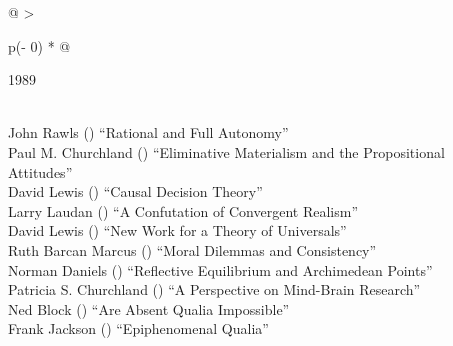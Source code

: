 \documentclass[
  10pt,
  letterpaper,
  DIV=11,
  numbers=noendperiod,
  twoside]{scrartcl}
\begin{document}
\begin{longtable}[]{@{}
  >{\raggedright\arraybackslash}p{(\columnwidth - 0\tabcolsep) * }@{}}

\caption{\label{tbl-top-ten-1980}Most cited articles published less than
ten years ago as of 1989.}

\tabularnewline

\toprule\noalign{}
\begin{minipage}[b]{\linewidth}\raggedright
1989
\end{minipage} \\
\midrule\noalign{}
\endhead
\bottomrule\noalign{}
\endlastfoot
John Rawls
()
``Rational and Full Autonomy'' \\
Paul M. Churchland
()
``Eliminative Materialism and the Propositional Attitudes'' \\
David Lewis
()
``Causal Decision Theory'' \\
Larry Laudan
()
``A Confutation of Convergent Realism'' \\
David Lewis
()
``New Work for a Theory of Universals'' \\
Ruth Barcan Marcus
()
``Moral Dilemmas and Consistency'' \\
Norman Daniels
()
``Reflective Equilibrium and Archimedean Points'' \\
Patricia S. Churchland
()
``A Perspective on Mind-Brain Research'' \\
Ned Block
()
``Are Absent Qualia Impossible'' \\
Frank Jackson
()
``Epiphenomenal Qualia'' \\

\end{longtable}
\end{document}
